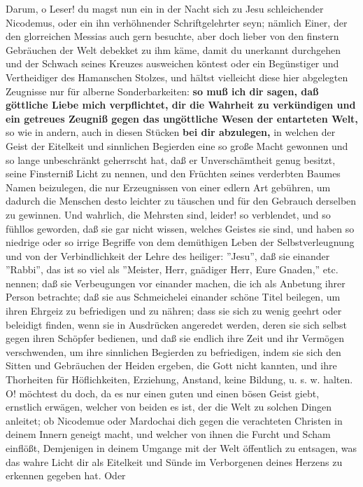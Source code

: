 Darum, o Leser! du magst nun ein in der Nacht sich zu Jesu schleichender
Nicodemus, oder ein ihn verhöhnender Schriftgelehrter seyn; nämlich Einer, der
den glorreichen Messias auch gern besuchte, aber doch lieber von den finstern
Gebräuchen der Welt debekket zu ihm käme, damit du unerkannt durchgehen und der
Schwach seines Kreuzes ausweichen köntest oder ein Begünstiger und Vertheidiger
des Hamanschen Stolzes, und hältst vielleicht diese hier abgelegten Zeugnisse
nur für alberne Sonderbarkeiten: \textbf{so muß ich dir sagen, daß göttliche Liebe mich
verpflichtet, dir die Wahrheit zu verkündigen und ein getreues Zeugniß gegen das
ungöttliche Wesen der entarteten Welt,} so wie in andern, auch in diesen Stücken
\textbf{bei dir abzulegen,} in welchen der Geist der Eitelkeit und sinnlichen Begierden
eine so große Macht gewonnen und so lange unbeschränkt geherrscht hat, daß er
Unverschämtheit genug besitzt, seine Finsterniß Licht zu nennen, und den
Früchten seines verderbten Baumes Namen beizulegen, die nur Erzeugnissen von
einer edlern Art gebühren, um dadurch die Menschen desto leichter zu täuschen
und für den Gebrauch derselben zu gewinnen. Und wahrlich, die Mehrsten sind,
leider! so verblendet, und so fühllos geworden, daß sie gar nicht wissen,
welches Geistes sie sind, und haben so niedrige oder so irrige Begriffe von dem
demüthigen Leben der Selbstverleugnung und von der Verbindlichkeit der Lehre des
heiliger: ''Jesu'', daß sie einander ''Rabbi'', das ist so viel als ''Meister,
Herr, gnädiger Herr, Eure Gnaden,'' etc. nennen; daß sie Verbeugungen vor
einander machen, die ich als Anbetung ihrer Person betrachte; daß sie aus
Schmeichelei einander schöne Titel beilegen, um ihren Ehrgeiz zu befriedigen und
zu nähren; dass sie sich zu wenig geehrt oder beleidigt finden, wenn sie in
Ausdrücken angeredet werden, deren sie sich selbst gegen ihren Schöpfer
bedienen, und daß sie endlich ihre Zeit und ihr Vermögen verschwenden, um ihre
sinnlichen Begierden zu befriedigen, indem sie sich den Sitten und Gebräuchen
der Heiden ergeben, die Gott nicht kannten, und ihre Thorheiten für
Höflichkeiten, Erziehung, Anstand, keine Bildung, u. s. w. halten. O! möchtest
du doch, da es nur einen guten und einen bösen Geist giebt, ernstlich erwägen,
welcher von beiden es ist, der die Welt zu solchen Dingen anleitet; ob Nicodemue
oder Mardochai dich gegen die verachteten Christen in deinem Innern geneigt
macht, und welcher von ihnen die Furcht und Scham einflößt, Demjenigen in deinem
Umgange mit der Welt öffentlich zu entsagen, was das wahre Licht dir als
Eitelkeit und Sünde im Verborgenen deines Herzens zu erkennen gegeben hat. Oder
